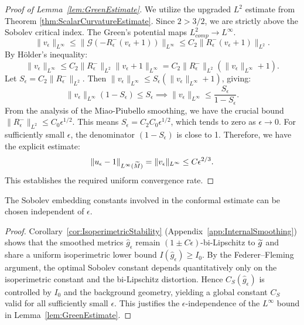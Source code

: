\begin{proof}[Proof of Lemma~\ref{lem:GreenEstimate}]
We utilize the upgraded $L^2$ estimate from Theorem \ref{thm:ScalarCurvatureEstimate}. Since $2 > 3/2$, we are strictly above the Sobolev critical index. The Green's potential maps $L^2_{comp} \to L^\infty$.
\[ \|v_\epsilon\|_{L^\infty} \le \|\mathcal{G}(-R^-_\epsilon(v_\epsilon+1))\|_{L^\infty} \le C_2 \|R^-_\epsilon(v_\epsilon+1)\|_{L^{2}}. \]
By H\"older's inequality:
\[ \|v_\epsilon\|_{L^\infty} \le C_2 \|R^-_\epsilon\|_{L^{2}} \|v_\epsilon+1\|_{L^\infty} = C_2 \|R^-_\epsilon\|_{L^{2}} (\|v_\epsilon\|_{L^\infty}+1). \]
Let $S_\epsilon = C_2 \|R^-_\epsilon\|_{L^{2}}$. Then $\|v_\epsilon\|_{L^\infty} \le S_\epsilon (\|v_\epsilon\|_{L^\infty}+1)$, giving:
\[ \|v_\epsilon\|_{L^\infty} (1 - S_\epsilon) \le S_\epsilon \implies \|v_\epsilon\|_{L^\infty} \le \frac{S_\epsilon}{1 - S_\epsilon}. \]
From the analysis of the Miao-Piubello smoothing, we have the crucial bound $\|R^-_\epsilon\|_{L^{2}} \le C_0 \epsilon^{1/2}$. This means $S_\epsilon = C_2 C_0 \epsilon^{1/2}$, which tends to zero as $\epsilon \to 0$. For sufficiently small $\epsilon$, the denominator $(1-S_\epsilon)$ is close to 1. Therefore, we have the explicit estimate:
\[ \|u_\epsilon - 1\|_{L^\infty(\widetilde{M})} = \|v_\epsilon\|_{L^\infty} \le C \epsilon^{2/3}. \]
This establishes the required uniform convergence rate.
\end{proof}

\begin{lemma}\label{lem:GlobalSobolev}
The Sobolev embedding constants involved in the conformal estimate can be chosen independent of $\epsilon$.
\end{lemma}
\begin{proof}
Corollary~\ref{cor:IsoperimetricStability} (Appendix~\ref{app:InternalSmoothing}) shows that the smoothed metrics $\hat{g}_\epsilon$ remain $(1\pm C\epsilon)$-bi-Lipschitz to $\widetilde{g}$ and share a uniform isoperimetric lower bound $I(\hat{g}_\epsilon) \ge I_0$. By the Federer--Fleming argument, the optimal Sobolev constant depends quantitatively only on the isoperimetric constant and the bi-Lipschitz distortion. Hence $C_S(\hat{g}_\epsilon)$ is controlled by $I_0$ and the background geometry, yielding a global constant $C_S$ valid for all sufficiently small $\epsilon$. This justifies the $\epsilon$-independence of the $L^\infty$ bound in Lemma~\ref{lem:GreenEstimate}.
\end{proof}

